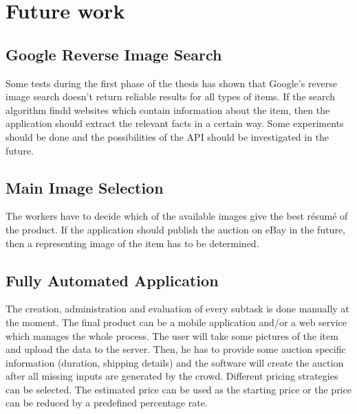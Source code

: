 \section{Future work}
\subsection{Google Reverse Image Search}
Some tests during the first phase of the thesis has shown that Google's reverse image search doesn't return reliable results for all types of items. If the search algorithm findd websites which contain information about the item, then the application should extract the relevant facts in a certain way. Some experiments should be done and the possibilities of the API should be investigated in the future. 
\subsection{Main Image Selection}
The workers have to decide which of the available images give the best r\'{e}sum\'{e} of the product. If the application should publish the auction on eBay in the future, then a representing image of the item has to be determined. 
\subsection{Fully Automated Application}
The creation, administration and evaluation of every subtask is done manually at the moment. The final product can be a mobile application and/or a web service which manages the whole process. The user will take some pictures of the item and upload the data to the server. Then, he has to provide some auction specific information (duration, shipping details) and the software will create the auction after all missing inputs are generated by the crowd. Different pricing strategies can be selected. The estimated price can be used as the starting price or the price can be reduced by a predefined percentage rate. 

